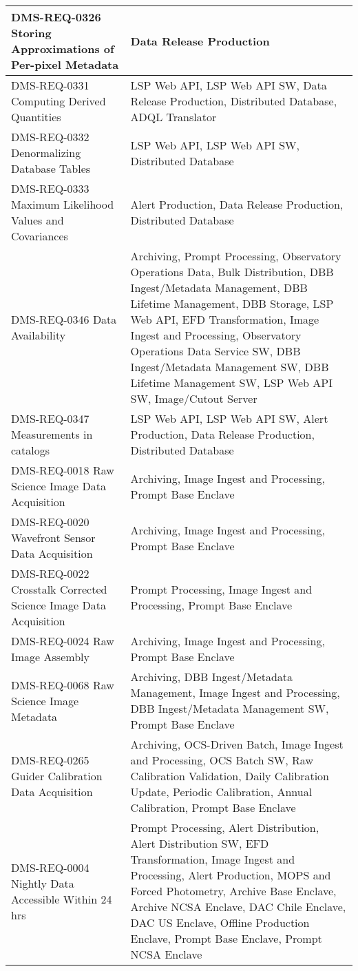 \begin{xtabular}{p{0.4\textwidth}p{0.55\textwidth}}

DMS-REQ-0326 Storing Approximations of Per-pixel Metadata & Data Release Production \\ \hline
DMS-REQ-0331 Computing Derived Quantities & LSP Web API, LSP Web API SW, Data Release Production, Distributed Database, ADQL Translator \\ \hline
DMS-REQ-0332 Denormalizing Database Tables & LSP Web API, LSP Web API SW, Distributed Database \\ \hline
DMS-REQ-0333 Maximum Likelihood Values and Covariances & Alert Production, Data Release Production, Distributed Database \\ \hline
DMS-REQ-0346 Data Availability & Archiving, Prompt Processing, Observatory Operations Data, Bulk Distribution, DBB Ingest/Metadata Management, DBB Lifetime Management, DBB Storage, LSP Web API, EFD Transformation, Image Ingest and Processing, Observatory Operations Data Service SW, DBB Ingest/Metadata Management SW, DBB Lifetime Management SW, LSP Web API SW, Image/Cutout Server \\ \hline
DMS-REQ-0347 Measurements in catalogs & LSP Web API, LSP Web API SW, Alert Production, Data Release Production, Distributed Database \\ \hline
DMS-REQ-0018 Raw Science Image Data Acquisition & Archiving, Image Ingest and Processing, Prompt Base Enclave \\ \hline
DMS-REQ-0020 Wavefront Sensor Data Acquisition & Archiving, Image Ingest and Processing, Prompt Base Enclave \\ \hline
DMS-REQ-0022 Crosstalk Corrected Science Image Data Acquisition & Prompt Processing, Image Ingest and Processing, Prompt Base Enclave \\ \hline
DMS-REQ-0024 Raw Image Assembly & Archiving, Image Ingest and Processing, Prompt Base Enclave \\ \hline
DMS-REQ-0068 Raw Science Image Metadata & Archiving, DBB Ingest/Metadata Management, Image Ingest and Processing, DBB Ingest/Metadata Management SW, Prompt Base Enclave \\ \hline
DMS-REQ-0265 Guider Calibration Data Acquisition & Archiving, OCS-Driven Batch, Image Ingest and Processing, OCS Batch SW, Raw Calibration Validation, Daily Calibration Update, Periodic Calibration, Annual Calibration, Prompt Base Enclave \\ \hline
DMS-REQ-0004 Nightly Data Accessible Within 24 hrs & Prompt Processing, Alert Distribution, Alert Distribution SW, EFD Transformation, Image Ingest and Processing, Alert Production, MOPS and Forced Photometry, Archive Base Enclave, Archive NCSA Enclave, DAC Chile Enclave, DAC US Enclave, Offline Production Enclave, Prompt Base Enclave, Prompt NCSA Enclave \\ \hline

\end{xtabular}
